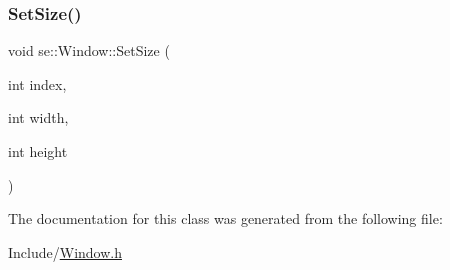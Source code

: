 \mbox{\label{classse_1_1_window_ac5e7a7985934606074e9c65f83f45260}} 
\subsubsection{\texorpdfstring{Set\+Size()}{SetSize()}}
{\footnotesize\ttfamily void se\+::\+Window\+::\+Set\+Size (\begin{DoxyParamCaption}\item[{int}]{index,  }\item[{int}]{width,  }\item[{int}]{height }\end{DoxyParamCaption})}



The documentation for this class was generated from the following file\+:\begin{DoxyCompactItemize}
\item 
Include/\mbox{\hyperlink{_window_8h}{Window.\+h}}\end{DoxyCompactItemize}
